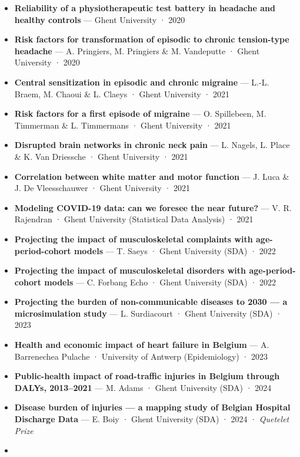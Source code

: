 \documentclass[
  letterpaper,
  DIV=11,
  numbers=noendperiod]{scrartcl}
\begin{document}
\begin{itemize}
{  cervicogenic headache --- a Delphi study} --- H. De Beule, C. De
  Cuyper \& F. De Cuyper · Ghent University · 2020
\item
  \textbf{Reliability of a physiotherapeutic test battery in headache
  and healthy controls} --- Ghent University · 2020
\item
  \textbf{Risk factors for transformation of episodic to chronic
  tension-type headache} --- A. Pringiers, M. Pringiers \& M. Vandeputte
  · Ghent University · 2020
\item
  \textbf{Central sensitization in episodic and chronic migraine} ---
  L.-L. Braem, M. Chaoui \& L. Claeys · Ghent University · 2021
\item
  \textbf{Risk factors for a first episode of migraine} --- O.
  Spillebeen, M. Timmerman \& L. Timmermans · Ghent University · 2021
\item
  \textbf{Disrupted brain networks in chronic neck pain} --- L. Nagels,
  L. Place \& K. Van Driessche · Ghent University · 2021
\item
  \textbf{Correlation between white matter and motor function} --- J.
  Luca \& J. De Vleesschauwer · Ghent University · 2021
\item
  \textbf{Modeling COVID-19 data: can we foresee the near future?} ---
  V. R. Rajendran · Ghent University (Statistical Data Analysis) · 2021
\item
  \textbf{Projecting the impact of musculoskeletal complaints with
  age-period-cohort models} --- T. Saeys · Ghent University (SDA) · 2022
\item
  \textbf{Projecting the impact of musculoskeletal disorders with
  age-period-cohort models} --- C. Forbang Echo · Ghent University (SDA)
  · 2022
\item
  \textbf{Projecting the burden of non-communicable diseases to 2030 ---
  a microsimulation study} --- L. Surdiacourt · Ghent University (SDA) ·
  2023
\item
  \textbf{Health and economic impact of heart failure in Belgium} --- A.
  Barrenechea Pulache · University of Antwerp (Epidemiology) · 2023
\item
  \textbf{Public-health impact of road-traffic injuries in Belgium
  through DALYs, 2013--2021} --- M. Adams · Ghent University (SDA) ·
  2024
\item
  \textbf{Disease burden of injuries --- a mapping study of Belgian
  Hospital Discharge Data} --- E. Boiy · Ghent University (SDA) · 2024 ·
  \emph{Quetelet Prize}
\item

\end{itemize}
\end{document}
